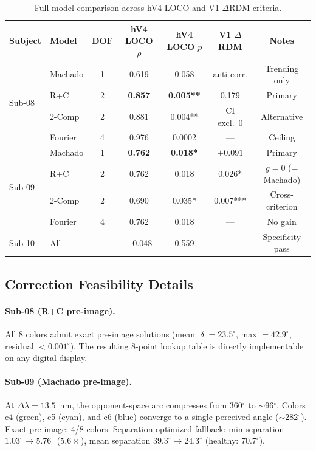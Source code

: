 \documentclass{article}
\begin{document}
\begin{table}[h]
  \caption{Full model comparison across hV4 LOCO and V1 $\Delta$RDM criteria.}
  \label{tab:full}
  \begin{center}
    \begin{small}
      \begin{tabular}{llccccc}
        \toprule
        Subject & Model & DOF & hV4 LOCO $\rho$ & hV4 LOCO $p$ & V1 $\Delta$RDM & Notes \\
        \midrule
        \multirow{4}{*}{Sub-08} & Machado & 1 & 0.619 & 0.058 & anti-corr. & Trending only \\
        & R+C & 2 & \textbf{0.857} & \textbf{0.005**} & 0.179 & Primary \\
        & 2-Comp & 2 & 0.881 & 0.004** & CI excl.\ 0 & Alternative \\
        & Fourier & 4 & 0.976 & 0.0002 & --- & Ceiling \\
        \midrule
        \multirow{4}{*}{Sub-09} & Machado & 1 & \textbf{0.762} & \textbf{0.018*} & $+0.091$ & Primary \\
        & R+C & 2 & 0.762 & 0.018 & 0.026* & $g{=}0$ (= Machado) \\
        & 2-Comp & 2 & 0.690 & 0.035* & 0.007*** & Cross-criterion \\
        & Fourier & 4 & 0.762 & 0.018 & --- & No gain \\
        \midrule
        Sub-10 & All & --- & $-0.048$ & 0.559 & --- & Specificity pass \\
        \bottomrule
      \end{tabular}
    \end{small}
  \end{center}
\end{table}

\subsection{Correction Feasibility Details}

\paragraph{Sub-08 (R+C pre-image).}
All 8 colors admit exact pre-image solutions (mean $|\delta| = 23.5^\circ$, max $= 42.9^\circ$, residual $< 0.001^\circ$).
The resulting 8-point lookup table is directly implementable on any digital display.

\paragraph{Sub-09 (Machado pre-image).}
At $\Delta\lambda = 13.5$~nm, the opponent-space arc compresses from 360$^\circ$ to $\sim$96$^\circ$.
Colors c4 (green), c5 (cyan), and c6 (blue) converge to a single perceived angle ($\sim$282$^\circ$).
Exact pre-image: 4/8 colors.
Separation-optimized fallback: min separation $1.03^\circ \to 5.76^\circ$ ($5.6\times$), mean separation $39.3^\circ \to 24.3^\circ$ (healthy: 70.7$^\circ$).
\end{document}
